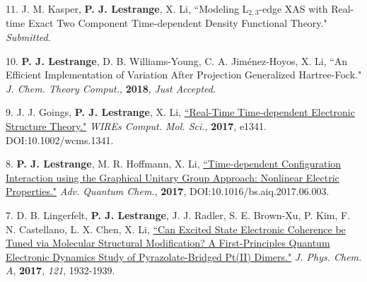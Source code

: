 


\begin{cvpublications}


\cvpublication
{11.} 
{J. M. Kasper, \textbf{P. J. Lestrange}, X. Li, ``Modeling L$_{2,3}$-edge XAS with Real-time Exact Two Component Time-dependent Density Functional Theory." \textit{Submitted}.} 


\cvpublication
{10.} 
{\textbf{P. J. Lestrange}, D. B. Williams-Young, C. A. Jim\'enez-Hoyos, X. Li, ``An Efficient Implementation of Variation After Projection Generalized Hartree-Fock." \textit{J. Chem. Theory Comput.}, \textbf{2018}, \textit{Just Accepted}.} 


\cvpublication
{9.} 
{J. J. Goings, \textbf{P. J. Lestrange}, X. Li, \href{http://onlinelibrary.wiley.com/doi/10.1002/wcms.1341/abstract}{``Real-Time Time-dependent Electronic Structure Theory."} \textit{WIREs Comput. Mol. Sci.}, \textbf{2017}, e1341. DOI:10.1002/wcms.1341.}


\cvpublication
{8.} 
{\textbf{P. J. Lestrange}, M. R. Hoffmann, X. Li, \href{http://www.sciencedirect.com/science/article/pii/S0065327617300618}{``Time-dependent Configuration Interaction using the Graphical Unitary Group Approach: Nonlinear Electric Properties."} \textit{Adv. Quantum Chem.}, \textbf{2017}, DOI:10.1016/bs.aiq.2017.06.003.} 


\cvpublication
{7.} 
{D. B. Lingerfelt, \textbf{P. J. Lestrange}, J. J. Radler, S. E. Brown-Xu, P. Kim, F. N. Castellano, L. X. Chen, X. Li, \href{http://pubs.acs.org/doi/abs/10.1021/acs.jpca.6b12099}{``Can Excited State Electronic Coherence be Tuned via Molecular Structural Modification? A First-Principles Quantum Electronic Dynamics Study of Pyrazolate-Bridged Pt(II) Dimers."} \textit{J. Phys. Chem. A}, \textbf{2017}, \textit{121}, 1932-1939.} 


\end{cvpublications}
